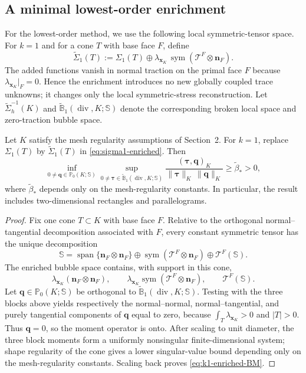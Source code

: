 \documentclass[review,hidelinks,onefignum,onetabnum]{siamart251216}
\renewcommand{\div}{\operatorname{div}}
\newcommand{\sym}{\operatorname{sym}}
\begin{document}
\subsection{A minimal lowest-order enrichment}\label{subsec:k1-enrichment}
For the lowest-order method, we use the following local symmetric-tensor space.  For
$k=1$ and for a cone $T$ with base face $F$, define
\begin{equation}\label{eq:sigma1-enriched}
\widetilde\Sigma_1(T)
:=\Sigma_1(T)
\oplus
\lambda_{\boldsymbol x_K}\,
\sym(\mathscr T^F\otimes\boldsymbol n_F).
\end{equation}
The added functions vanish in normal traction on the primal face $F$ because
$\lambda_{\boldsymbol x_K}|_F=0$.  Hence the enrichment introduces no new
globally coupled trace unknowns; it changes only the local symmetric-stress
reconstruction.  Let $\widetilde\Sigma_h^{-1}(K)$ and
$\widetilde{\mathbb B}_1(\div,K;\mathbb S)$ denote the corresponding broken
local space and zero-traction bubble space.

\begin{theorem}
\label{thm:k1-enriched-BM}
Let $K$ satisfy the mesh regularity assumptions of Section~2.  For $k=1$,
replace $\Sigma_1(T)$ by $\widetilde\Sigma_1(T)$ in
\eqref{eq:sigma1-enriched}.  Then
\begin{equation}\label{eq:k1-enriched-BM}
 \inf_{0\ne\boldsymbol q\in\mathbb P_0(K;\mathbb S)}
 \sup_{0\ne\boldsymbol\tau\in
 \widetilde{\mathbb B}_1(\div,K;\mathbb S)}
 \frac{(\boldsymbol\tau,\boldsymbol q)_K}
 {\|\boldsymbol\tau\|_K\,\|\boldsymbol q\|_K}
 \ge \widetilde\beta_*>0,
\end{equation}
where $\widetilde\beta_*$ depends only on the mesh-regularity constants.
In particular, the result includes two-dimensional rectangles and
parallelograms.
\end{theorem}
\begin{proof}
Fix one cone $T\subset K$ with base face $F$.  Relative to the orthogonal
normal--tangential decomposition associated with $F$, every constant symmetric
tensor has the unique decomposition
\[
 \mathbb S
 =\operatorname{span}\{\boldsymbol n_F\otimes\boldsymbol n_F\}
 \oplus\sym(\mathscr T^F\otimes\boldsymbol n_F)
 \oplus\mathscr T^F(\mathbb S).
\]
The enriched bubble space contains, with support in this cone,
\[
 \lambda_{\boldsymbol x_K}
 (\boldsymbol n_F\otimes\boldsymbol n_F),
 \qquad
 \lambda_{\boldsymbol x_K}\sym(\mathscr T^F\otimes\boldsymbol n_F),
 \qquad
 \mathscr T^F(\mathbb S).
\]
Let $\boldsymbol q\in\mathbb P_0(K;\mathbb S)$ be orthogonal to
$\widetilde{\mathbb B}_1(\div,K;\mathbb S)$.  Testing with the three blocks
above yields respectively the normal--normal, normal--tangential, and
purely tangential components of $\boldsymbol q$ equal to zero, because
$\int_T\lambda_{\boldsymbol x_K}>0$ and $|T|>0$.  Thus
$\boldsymbol q=0$, so the moment operator is onto.  After scaling to unit
diameter, the three block moments form a uniformly nonsingular finite-dimensional
system; shape regularity of the cone gives a lower singular-value bound depending
only on the mesh-regularity constants.  Scaling back proves
\eqref{eq:k1-enriched-BM}.
\end{proof}
\end{document}
